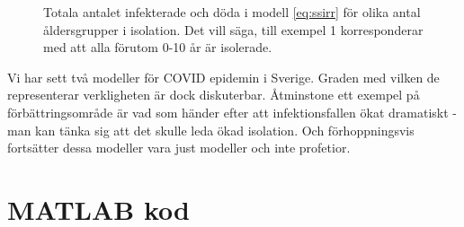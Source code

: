 \documentclass{article}
\newcommand\covid{COVID\nobreakdash-19}
\begin{document}
\begin{figure}
	\centering
	\caption{Totala antalet infekterade och döda i modell \eqref{eq:ssirr} för olika
	antal åldersgrupper i isolation.
	Det vill säga, till exempel 1 korresponderar med att alla förutom 0-10 år är isolerade.
	\label{fig:isolation_values}}
\end{figure}

\vspace{2em}

Vi har sett två modeller för \covid{} epidemin i Sverige.
Graden med vilken de representerar verkligheten är dock diskuterbar.
Åtminstone ett exempel på förbättringsområde är vad som händer
efter att infektionsfallen ökat dramatiskt -
man kan tänka sig att det skulle leda ökad isolation.
Och förhoppningsvis fortsätter dessa modeller vara just modeller
och inte profetior.

\appendix

\section{MATLAB kod}


\printbibliography
\end{document}
